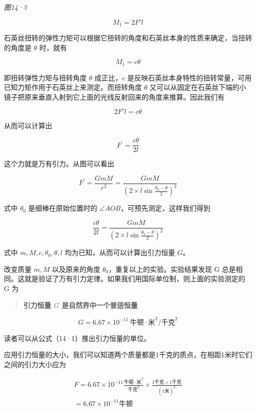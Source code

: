 \emph{图14·3}

\[
M_{1}=2F'l
\]

石英丝扭转的弹性力矩可以根据它扭转的角度和石英丝本身的性质来确定，当扭转的角度是
\(\theta\) 时，就有

\[
M _ {1} = c \theta
\]

即扭转弹性力矩与扭转角度 \(\theta\) 成正比，\(c\)
是反映石英丝本身特性的扭转常量，可用已知力矩作用于石英丝上来测定。而扭转角度
\(\theta\)
又可以从固定在石英丝下端的小镜子把原来垂直入射到它上面的光线反射回来的角度来推算。因此我们有

\[
2F'l=c\theta
\]

从而可以计算出

\[
F ^ {\prime} = \frac {c \theta}{2 l}
\]

这个力就是万有引力。从图可以看出

\[
F ^ {\prime} = \frac {G m M}{r ^ {2}} = \frac {G m M}{\left(2 \times l \sin \frac {\theta_ {0} - \theta}{2}\right) ^ {2}}
\]

式中 \(\theta_0\) 是细棒在原始位置时的
\(\angle AOB\)，可预先测定，这样我们得到

\[
\frac {c \theta}{2 l} = \frac {G m M}{\left(2 \times l \sin \frac {\theta_ {0} - \theta}{2}\right) ^ {2}}
\]

式中 \(m, M, c, \theta_0, \theta, l\) 均为已知，从而可以计算出引力恒量
\(G\)。

改变质量 \(m, M\) 以及原来的角度
\(\theta_0\)，重复以上的实验。实验结果发现 G
总是相同。这就是验证了万有引力定律。如果我们用国际单位制，则上面的实验测定的
G 为

\begin{quote}
\textbf{引力恒量 \(G\) 是自然界中一个普适恒量}
\end{quote}

\[
G=6.67\times10^{-11}\ \text{牛顿}\mathbin{\cdot}\text{米}^{2}/\text{千克}^{2}
\]

读者可以从公式（14·1）推出引力恒量的单位。

应用引力恒量的大小，我们可以知道两个质量都是1千克的质点，在相距1米时它们之间的引力大小应为

\[
\begin{array}{l} F = 6.67 \times 10 ^ {- 11} \frac {\text{牛顿} \cdot \text{米} ^ {2}}{\text{千克} ^ {2}} \times \frac {1 \text{千克} \times 1 \text{千克}}{(1 \text{米}) ^ {2}} \\ = 6.67 \times 10 ^ {- 11} \text{牛顿} \\ \end{array}
\]

